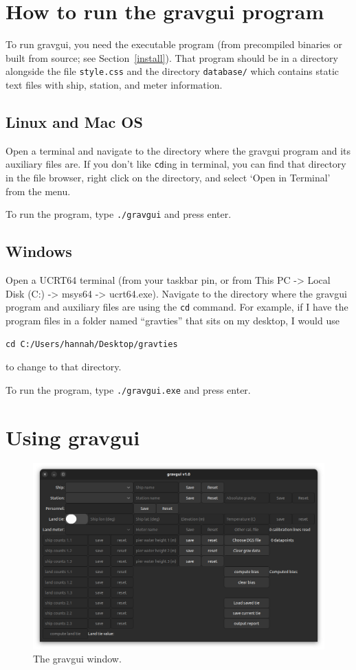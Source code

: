 \documentclass{pfpe-manual}
\begin{document}
\section{How to run the gravgui program}
\label{run-gg}
To run gravgui, you need the executable program (from precompiled binaries or built from source; see Section~\ref{install}). That program should be in a directory alongside the file \texttt{style.css} and the directory \texttt{database/} which contains static text files with ship, station, and meter information.

\subsection{Linux and Mac OS}
Open a terminal and navigate to the directory where the gravgui program and its auxiliary files are. If you don't like \texttt{cd}ing in terminal, you can find that directory in the file browser, right click on the directory, and select `Open in Terminal' from the menu.

To run the program, type \texttt{./gravgui} and press enter.

\subsection{Windows}
Open a UCRT64 terminal (from your taskbar pin, or from This PC -> Local Disk (C:) -> msys64 -> ucrt64.exe). Navigate to the directory where the gravgui program and auxiliary files are using the \texttt{cd} command. For example, if I have the program files in a folder named ``gravties'' that sits on my desktop, I would use
\begin{verbatim}
cd C:/Users/hannah/Desktop/gravties
\end{verbatim}
to change to that directory.

To run the program, type \texttt{./gravgui.exe} and press enter.

\section{Using gravgui}

\begin{figure}[ht!]
\centering
\includegraphics[width=\textwidth]{figs/gravgui_window_init.png}
\caption{The gravgui window.}
\label{fig:window}
\end{figure}
\end{document}
